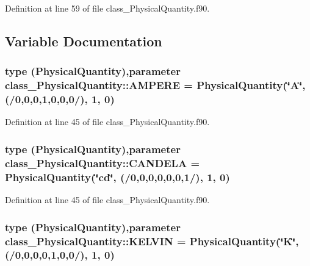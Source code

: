Definition at line 59 of file class\_\-PhysicalQuantity.f90.



\subsection{Variable Documentation}
\hypertarget{namespaceclass__PhysicalQuantity_a9672ba1ed56d49205a831ba235421de8}{
\subsubsection[{AMPERE}]{\setlength{\rightskip}{0pt plus 5cm}type ({\bf PhysicalQuantity}),parameter {\bf class\_\-PhysicalQuantity::AMPERE} = {\bf PhysicalQuantity}(\char`\"{}A\char`\"{}, (/0,0,0,1,0,0,0/), 1, 0)}}
\label{namespaceclass__PhysicalQuantity_a9672ba1ed56d49205a831ba235421de8}


Definition at line 45 of file class\_\-PhysicalQuantity.f90.

\hypertarget{namespaceclass__PhysicalQuantity_ad332548c0150950850a5fece3ef0e8d2}{
\subsubsection[{CANDELA}]{\setlength{\rightskip}{0pt plus 5cm}type ({\bf PhysicalQuantity}),parameter {\bf class\_\-PhysicalQuantity::CANDELA} = {\bf PhysicalQuantity}(\char`\"{}cd\char`\"{}, (/0,0,0,0,0,0,1/), 1, 0)}}
\label{namespaceclass__PhysicalQuantity_ad332548c0150950850a5fece3ef0e8d2}


Definition at line 45 of file class\_\-PhysicalQuantity.f90.

\hypertarget{namespaceclass__PhysicalQuantity_a2fd77862111da187e89aaf75383baa00}{
\subsubsection[{KELVIN}]{\setlength{\rightskip}{0pt plus 5cm}type ({\bf PhysicalQuantity}),parameter {\bf class\_\-PhysicalQuantity::KELVIN} = {\bf PhysicalQuantity}(\char`\"{}K\char`\"{}, (/0,0,0,0,1,0,0/), 1, 0)}}
\label{namespaceclass__PhysicalQuantity_a2fd77862111da187e89aaf75383baa00}


